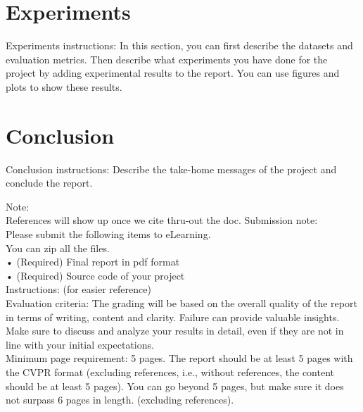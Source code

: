 \documentclass[10pt,twocolumn,letterpaper]{article}
\newcommand\tab[1][0.5cm]{\hspace*{#1}}
\begin{document}
    \section{Experiments}
    Experiments instructions: In this section, you can first describe the datasets and evaluation metrics.
    Then describe what experiments you have done for the project by adding experimental results
    to the report. You can use figures and plots to show these results.

    \section{Conclusion}
    Conclusion instructions: Describe the take-home messages of the project and conclude the report.

    \newpage



    {\small
    
    
    }
    Note:\\
    \tab References will show up once we cite thru-out the doc.
    \newpage
    Submission note: \\
    \tab Please submit the following items to eLearning. \\
    \tab You can zip all the files. \\
    \tab\tab • (Required) Final report in pdf format \\
    \tab\tab • (Required) Source code of your project \\

    Instructions: (for easier reference)\\
    \newline
    Evaluation criteria:
    The grading will be based on the overall quality of the report
    in terms of writing, content and clarity. Failure can provide
    valuable insights. Make sure to discuss and analyze your results
    in detail, even if they are not in line with your initial expectations.\\

    Minimum page requirement: 5 pages.
    The report should be at least 5 pages with the CVPR format
    (excluding references, i.e., without references, the content
    should be at least 5 pages). You can go beyond 5 pages, but
    make sure it does not surpass 6 pages in length. (excluding references).
\end{document}
